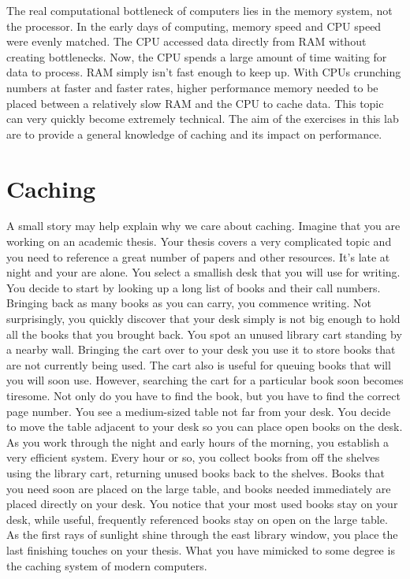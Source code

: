 
The real computational bottleneck of computers lies in the memory system, not the processor.
In the early days of computing, memory speed and CPU speed were evenly matched.
The CPU accessed data directly from RAM without creating bottlenecks.
Now, the CPU spends a large amount of time waiting for data to process.
RAM simply isn't fast enough to keep up.  With CPUs crunching numbers at faster and faster rates, higher performance memory needed to be placed between a relatively slow RAM and the CPU to cache data.
This topic can very quickly become extremely technical.
The aim of the exercises in this lab are to provide a general knowledge of caching and its impact on performance.


\section*{Caching}
A small story may help explain why we care about caching.
Imagine that you are working on an academic thesis.
Your thesis covers a very complicated topic and you need to reference a great number of papers and other resources.
It's late at night and your are alone.
You select a smallish desk that you will use for writing.
You decide to start by looking up a long list of books and their call numbers.  Bringing back as many books as you can carry, you commence writing.
Not surprisingly, you quickly discover that your desk simply is not big enough to hold all the books that you brought back.
You spot an unused library cart standing by a nearby wall.
Bringing the cart over to your desk you use it to store books that are not currently being used.
The cart also is useful for queuing books that will you will soon use.
However, searching the cart for a particular book soon becomes tiresome.
Not only do you have to find the book, but you have to find the correct page number.
You see a medium-sized table not far from your desk.
You decide to move the table adjacent to your desk so you can place open books on the desk.
As you work through the night and early hours of the morning, you establish a very efficient system.
Every hour or so, you collect books from off the shelves using the library cart, returning unused books back to the shelves.
Books that you need soon are placed on the large table, and books needed immediately are placed directly on your desk.
You notice that your most used books stay on your desk, while useful, frequently referenced books stay on open on the large table.
As the first rays of sunlight shine through the east library window, you place the last finishing touches on your thesis.
What you have mimicked to some degree is the caching system of modern computers.

